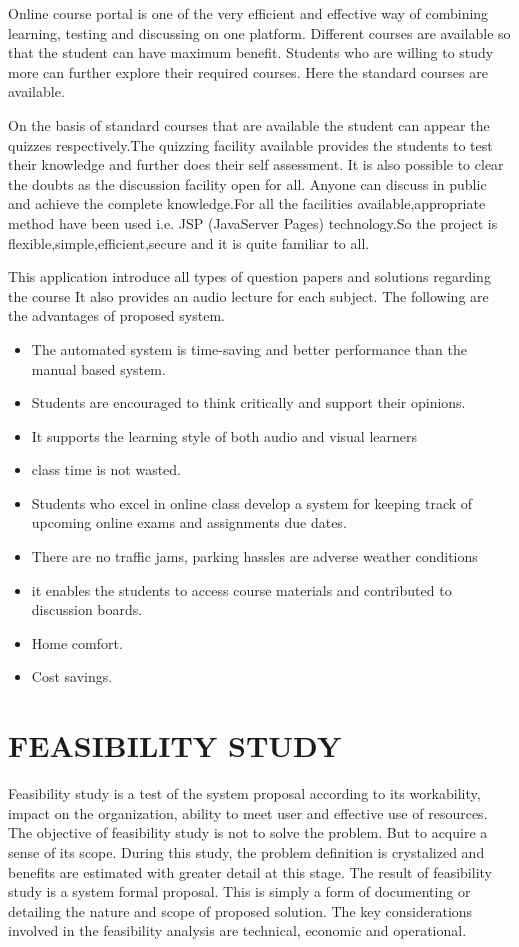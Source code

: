 Online course portal is one of the very efficient and effective way of combining learning, testing and discussing on one platform. Different courses are available so that  the student can have maximum benefit. Students who are willing to study more can further explore their required courses. Here the standard courses are available.

 On the basis of standard courses that  are available the student can appear the quizzes respectively.The quizzing facility available provides the students to test their knowledge and further does their self assessment. It is also possible to clear the doubts as the discussion facility open for all. Anyone can discuss in public and achieve the complete knowledge.For all the facilities available,appropriate method have been used i.e. JSP (JavaServer Pages) technology.So the project is flexible,simple,efficient,secure and it is quite familiar to all.

This application introduce all types of question papers and solutions regarding the course
It also provides an audio lecture for each subject.
The  following are the advantages of proposed system.
\begin{itemize}
\item The automated system is time-saving and better performance than the manual based system.
\item Students are encouraged to think critically and support their opinions.
\item It supports the learning style of both audio and visual learners
\item class time is not wasted.
\item Students who excel in online class develop a system for keeping track of upcoming online exams and assignments due dates.
\item There are no traffic jams, parking hassles are adverse weather conditions
\item it enables the students to access course materials and contributed to discussion boards.
\item Home comfort.
\item Cost savings.

\end{itemize}
%
%
%
%
\chapter{FEASIBILITY STUDY}
Feasibility study is a test of the system proposal according to its workability, impact on the organization, ability to meet user and effective use of resources. The objective of feasibility study is not to solve the problem. But to acquire a sense of its scope. During this study, the problem definition is crystalized and benefits are estimated with greater detail at this stage. The result of feasibility study is a system formal proposal. This is simply a form of documenting or detailing the nature and scope of proposed solution. The key considerations involved in the feasibility analysis are technical, economic and operational.
%
